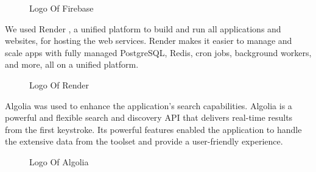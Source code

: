 \begin{figure}[H]
    \centering
    \caption{  Logo Of Firebase }
    \label{fig: Firebase_Logo}
\end{figure}

\newpage
We used {\color{purple}Render} \cite{render}, a unified platform to build and run all applications and websites, for hosting the web services. Render makes it easier to manage and scale apps with fully managed PostgreSQL, Redis, cron jobs, background workers, and more, all on a unified platform.

\begin{figure}[H]
    \centering
    \caption{  Logo Of Render }
    \label{fig: Render_Logo}
\end{figure}



{\color{purple}Algolia} \cite{algolia} was used to enhance the application's search capabilities. Algolia is a powerful and flexible search and discovery API that delivers real-time results from the first keystroke. Its powerful features enabled the application to handle the extensive data from the  toolset and provide a user-friendly experience.

\begin{figure}[H]
    \centering
    \caption{  Logo Of Algolia }
    \label{fig: Algolia_Logo}
\end{figure}

